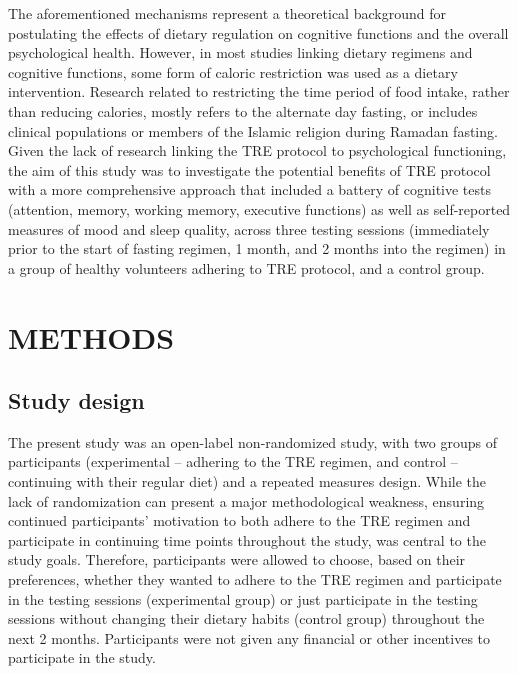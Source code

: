 \documentclass[authordate, empirical]{jote-new-article}
\begin{document}
The aforementioned mechanisms represent a theoretical background for postulating the effects of dietary regulation on cognitive functions and the overall psychological health. However, in most studies linking dietary regimens and cognitive functions, some form of caloric restriction was used as a dietary intervention. Research related to restricting the time period of food intake, rather than reducing calories, mostly refers to the alternate day fasting, or includes clinical populations or members of the Islamic religion during Ramadan fasting. Given the lack of research linking the TRE protocol to psychological functioning, the aim of this study was to investigate the potential benefits of TRE protocol with a more comprehensive approach that included a battery of cognitive tests (attention, memory, working memory, executive functions) as well as self-reported measures of mood and sleep quality, across three testing sessions (immediately prior to the start of fasting regimen, 1 month, and 2 months into the regimen) in a group of healthy volunteers adhering to TRE protocol, and a control group.



\section{METHODS}



\subsection{Study design}



The present study was an open-label non-randomized study, with two groups of participants (experimental -- adhering to the TRE regimen, and control -- continuing with their regular diet) and a repeated measures design.\textbf{ }While the lack of randomization can present a major methodological weakness, ensuring continued participants' motivation to both adhere to the TRE regimen and participate in continuing time points throughout the study, was central to the study goals. Therefore, participants were allowed to choose, based on their preferences, whether they wanted to adhere to the TRE regimen and participate in the testing sessions (experimental group) or just participate in the testing sessions without changing their dietary habits (control group) throughout the next 2 months. Participants were not given any financial or other incentives to participate in the study.
\end{document}
